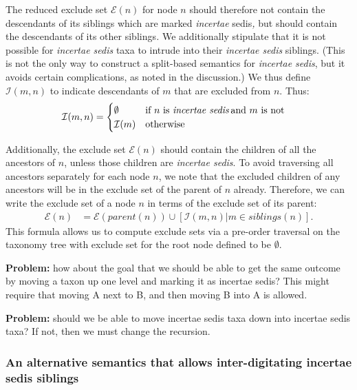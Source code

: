 \documentclass[english]{article}
\begin{document}
The reduced exclude set $\mathcal{E}(n)$ for node $n$ should therefore
not contain the descendants of its siblings which are marked
\emph{incertae }sedis\emph{,} but should contain the descendants of
its other siblings\emph{.
}We additionally stipulate that it is not
possible for \emph{incertae sedis} taxa to intrude into their
\emph{incertae sedis} siblings.
(This is not the only way to construct
a split-based semantics for \emph{incertae sedis}, but it avoids
certain complications, as noted in the discussion.) We thus define
$\mathcal{I}(m,n)$ to indicate descendants of $m$ that are excluded
from $n$.
Thus:
\begin{align*}
\mathcal{I}(m,n) & =
    \begin{cases}
        \emptyset & \text{if }n\text{ is \emph{incertae sedis}\,and }m\text{
is not}\\
        \mathcal{I}(m) & \text{otherwise}
    \end{cases}
\end{align*}

Additionally, the exclude set $\mathcal{E}(n)$ should contain the
children of all the ancestors of $n$, unless those children are
\emph{incertae sedis}.
To avoid traversing all ancestors separately
for each node $n$, we note that the excluded children of any ancestors
will be in the exclude set of the parent of $n$ already.
Therefore, we
can write the exclude set of a node $n$ in terms of the exclude set of
its parent:
\begin{align}
    \mathcal{E}(n) & = \mathcal{E}(parent(n))\cup\left[\mathcal{I}(m,n)\big|m\in
           siblings(n)\right].\label{eq:exclude-set-formula-1}
\end{align}
This
formula allows us to compute exclude sets via a pre-order traversal on
the taxonomy tree with exclude set for the root node defined to be
$\emptyset$.

\textbf{Problem:} how about the goal that we should be able to get the
same outcome by moving a taxon up one level and marking it as incertae
sedis? This might require that moving A next to B, and then moving B
into A is allowed.

\textbf{Problem:} should we be able to move incertae sedis taxa down
into incertae sedis taxa? If not, then we must change the recursion.

\subsubsection{An alternative semantics that allows inter-digitating
incertae sedis siblings}
\end{document}
